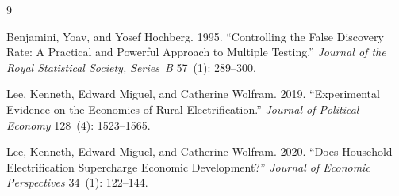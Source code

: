\documentclass[12pt]{article}
\begin{document}
\clearpage
\begin{singlespace}
\begin{thebibliography}{9}

Benjamini, Yoav, and Yosef Hochberg. 1995.
``Controlling the False Discovery Rate: A Practical and Powerful
Approach to Multiple Testing.''
\textit{Journal of the Royal Statistical Society, Series~B}
57~(1): 289--300.

Lee, Kenneth, Edward Miguel, and Catherine Wolfram. 2019.
``Experimental Evidence on the Economics of Rural Electrification.''
\textit{Journal of Political Economy} 128~(4): 1523--1565.

Lee, Kenneth, Edward Miguel, and Catherine Wolfram. 2020.
``Does Household Electrification Supercharge Economic Development?''
\textit{Journal of Economic Perspectives} 34~(1): 122--144.

\end{thebibliography}
\end{singlespace}
\end{document}
